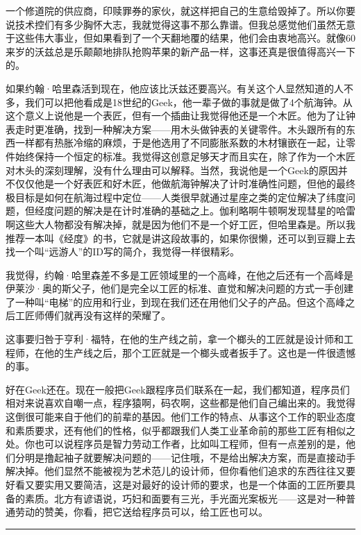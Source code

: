 一个修道院的供应商，印赎罪券的家伙，就这样把自己的生意给毁掉了。所以你要说技术控们有多少胸怀大志，我就觉得这事不那么靠谱。但我总感觉他们虽然无意于这些伟大事业，但如果看到了一个天翻地覆的结果，他们会由衷地高兴。就像60来岁的沃兹总是乐颠颠地排队抢购苹果的新产品一样，这事还真是很值得高兴一下的。

如果约翰·哈里森活到现在，他应该比沃兹还要高兴。有关这个人显然知道的人不多，我们可以把他看成是18世纪的Geek，他一辈子做的事就是做了4个航海钟。从这个意义上说他是一个表匠，但有一个插曲让我觉得他还是一个木匠。他为了让钟表走时更准确，找到一种解决方案------用木头做钟表的关键零件。木头跟所有的东西一样都有热胀冷缩的麻烦，于是他选用了不同膨胀系数的木材镶嵌在一起，让零件始终保持一个恒定的标准。我觉得这创意足够天才而且实在，除了作为一个木匠对木头的深刻理解，没有什么理由可以解释。当然，我说他是一个Geek的原因并不仅仅他是一个好表匠和好木匠，他做航海钟解决了计时准确性问题，但他的最终极目标是如何在航海过程中定位------人类很早就通过星座之类的定位解决了纬度问题，但经度问题的解决是在计时准确的基础之上。伽利略啊牛顿啊发现彗星的哈雷啊这些大人物都没有解决掉，就是因为他们不是一个好工匠，但哈里森是。所以我推荐一本叫《经度》的书，它就是讲这段故事的，如果你很懒，还可以到豆瓣上去找一个叫``远游人''的ID写的简介，我觉得一样很精彩。

我觉得，约翰·哈里森差不多是工匠领域里的一个高峰，在他之后还有一个高峰是伊莱沙·奥的斯父子，他们是完全以工匠的标准、直觉和解决问题的方式一手创建了一种叫``电梯''的应用和行业，到现在我们还在用他们父子的产品。但这个高峰之后工匠师傅们就再没有这样的荣耀了。

这事要归咎于亨利·福特，在他的生产线之前，拿一个榔头的工匠就是设计师和工程师，在他的生产线之后，那个工匠就是一个榔头或者扳手了。这也是一件很遗憾的事。

好在Geek还在。现在一般把Geek跟程序员们联系在一起，我们都知道，程序员们相对来说喜欢自嘲一点，程序猿啊，码农啊，这些都是他们自己编出来的。我觉得这倒很可能来自于他们的前辈的基因。他们工作的特点、从事这个工作的职业态度和素质要求，还有他们的性格，似乎都跟我们人类工业革命前的那些工匠有相似之处。你也可以说程序员是智力劳动工作者，比如叫工程师，但有一点差别的是，他们分明是撸起袖子就要解决问题的------记住哦，不是给出解决方案，而是直接动手解决掉。他们显然不能被视为艺术范儿的设计师，但你看他们追求的东西往往又要好看又要实用又要简洁，这是对最好的设计师的要求，也是一个体面的工匠所要具备的素质。北方有谚语说，巧妇和面要有三光，手光面光案板光------这是对一种普通劳动的赞美，你看，把它送给程序员可以，给工匠也可以。

\begin{center}\rule{0.5\linewidth}{0.5pt}\end{center}

